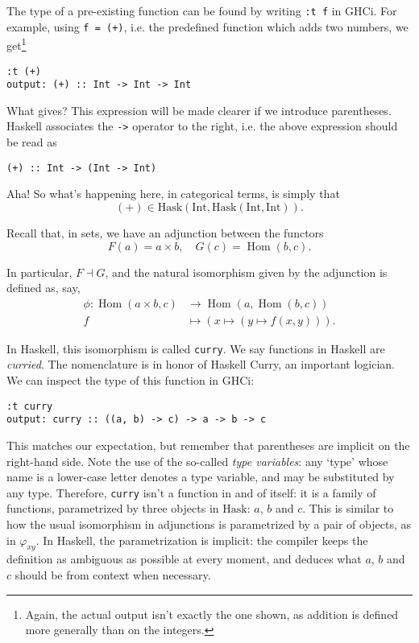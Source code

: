 \documentclass[11pt]{article}
\theoremstyle{nonumberplain}
\newcommand{\Hask}{\mathrm{Hask}}
\newcommand{\type}[1]{\mathrm{#1}}
\DeclareMathOperator{\Hom}{Hom}
\newcommand*\lsin{\lstinline}
\begin{document}
The type of a pre-existing function can be found by writing \lsin|:t f| in GHCi. For example, using \lsin|f = (+)|, i.e. the predefined function which adds two numbers, we get\footnote{Again, the actual output isn't exactly the one shown, as addition is defined more generally than on the integers.}
\begin{lstlisting}
:t (+)
output: (+) :: Int -> Int -> Int
\end{lstlisting}

What gives? This expression will be made clearer if we introduce parentheses. Haskell associates the \lsin|->| operator to the right, i.e. the above expression should be read as
\begin{lstlisting}
(+) :: Int -> (Int -> Int)
\end{lstlisting}

Aha! So what's happening here, in categorical terms, is simply that
\begin{equation}
(+) \in \Hask(\type{Int}, \Hask(\type{Int}, \type{Int})).
\end{equation}

Recall that, in sets, we have an adjunction between the functors
\begin{equation}
F(a) = a \times b, \quad G(c) = \Hom(b,c).
\end{equation}

In particular, $F \dashv G$, and the natural isomorphism given by the adjunction is defined as, say,
\begin{equation}
\begin{aligned}
\phi \colon \Hom(a \times b, c) &\to \Hom(a, \Hom(b,c))\\
f &\mapsto (x \mapsto (y \mapsto f(x,y))).
\end{aligned}
\end{equation}

In Haskell, this isomorphism is called \lsin|curry|. We say functions in Haskell are \emph{curried}. The nomenclature is in honor of Haskell Curry, an important logician. We can inspect the type of this function in GHCi:
\begin{lstlisting}
:t curry
output: curry :: ((a, b) -> c) -> a -> b -> c
\end{lstlisting}

This matches our expectation, but remember that parentheses are implicit on the right-hand side. Note the use of the so-called \emph{type variables}: any `type' whose name is a lower-case letter denotes a type variable, and may be substituted by any type. Therefore, \lsin|curry| isn't a function in and of itself: it is a family of functions, parametrized by three objects in $\Hask$: $a$, $b$ and $c$. This is similar to how the usual isomorphism in adjunctions is parametrized by a pair of objects, as in $\varphi_{xy}$. In Haskell, the parametrization is implicit: the compiler keeps the definition as ambiguous as possible at every moment, and deduces what $a$, $b$ and $c$ should be from context when necessary.
\end{document}
